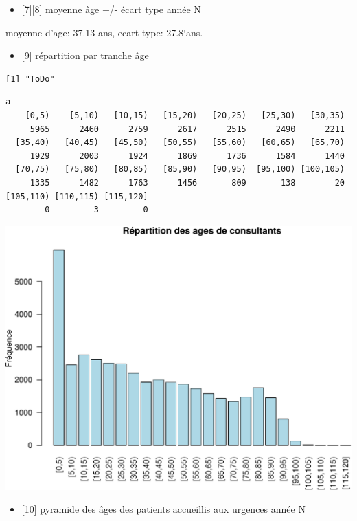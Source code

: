 \documentclass[]{article}
\begin{document}
\begin{itemize}
\itemsep1pt\parskip0pt
\item
  {[}7{]}{[}8{]} moyenne âge +/- écart type année N
\end{itemize}

moyenne d'age: 37.13 ans, ecart-type: 27.8`ans.

\begin{itemize}
\itemsep1pt\parskip0pt
\item
  {[}9{]} répartition par tranche âge
\end{itemize}

\begin{verbatim}
[1] "ToDo"
\end{verbatim}

\begin{verbatim}
a
    [0,5)    [5,10)   [10,15)   [15,20)   [20,25)   [25,30)   [30,35) 
     5965      2460      2759      2617      2515      2490      2211 
  [35,40)   [40,45)   [45,50)   [50,55)   [55,60)   [60,65)   [65,70) 
     1929      2003      1924      1869      1736      1584      1440 
  [70,75)   [75,80)   [80,85)   [85,90)   [90,95)  [95,100) [100,105) 
     1335      1482      1763      1456       809       138        20 
[105,110) [110,115) [115,120] 
        0         3         0 
\end{verbatim}

\includegraphics{rapport_2014_files/figure-latex/tranche-1.pdf}

\begin{itemize}
\itemsep1pt\parskip0pt
\item
  {[}10{]} pyramide des âges des patients accueillis aux urgences année
  N
\end{itemize}
\end{document}
